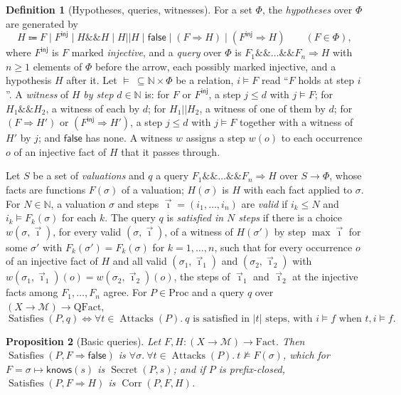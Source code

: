 \documentclass[11pt]{article}
\theoremstyle{definition}
\newtheorem{definition}{Definition}[section]
\theoremstyle{plain}
\newtheorem{proposition}[definition]{Proposition}
\theoremstyle{remark}
\newcommand{\N}{\mathbb{N}}
\newcommand{\Proc}{\mathrm{Proc}}
\newcommand{\Fact}{\mathrm{Fact}}
\newcommand{\Attacks}{\operatorname{Attacks}}
\newcommand{\Secret}{\operatorname{Secret}}
\newcommand{\Corr}{\operatorname{Corr}}
\newcommand{\Satisfies}{\operatorname{Satisfies}}
\begin{document}
\begin{definition}[Hypotheses, queries, witnesses]\label{def:queries-trace}
For a set $\Phi$, the \emph{hypotheses} over $\Phi$ are generated by
\[
H\Coloneqq F\mid F^{\mathsf{inj}}\mid H\mathbin{\&\&}H\mid H\mathbin{||}H\mid\mathsf{false}\mid(F\Longrightarrow H)\mid(F^{\mathsf{inj}}\Longrightarrow H)\qquad(F\in\Phi),
\]
where $F^{\mathsf{inj}}$ is $F$ marked \emph{injective}, and a \emph{query} over $\Phi$ is $F_1\mathbin{\&\&}\dots\mathbin{\&\&}F_n\Longrightarrow H$ with $n\ge1$ elements of $\Phi$ before the arrow, each possibly marked injective, and a hypothesis $H$ after it. Let $\models\ \subseteq\N\times\Phi$ be a relation, $i\models F$ read ``$F$ holds at step $i$''. A \emph{witness} of $H$ \emph{by step} $d\in\N$ is: for $F$ or $F^{\mathsf{inj}}$, a step $j\le d$ with $j\models F$; for $H_1\mathbin{\&\&}H_2$, a witness of each by $d$; for $H_1\mathbin{||}H_2$, a witness of one of them by $d$; for $(F\Longrightarrow H')$ or $(F^{\mathsf{inj}}\Longrightarrow H')$, a step $j\le d$ with $j\models F$ together with a witness of $H'$ by $j$; and $\mathsf{false}$ has none. A witness $w$ assigns a step $w(o)$ to each occurrence $o$ of an injective fact of $H$ that it passes through.

Let $S$ be a set of \emph{valuations} and $q$ a query $F_1\mathbin{\&\&}\dots\mathbin{\&\&}F_n\Longrightarrow H$ over $S\to\Phi$, whose facts are functions $F(\sigma)$ of a valuation; $H(\sigma)$ is $H$ with each fact applied to $\sigma$. For $N\in\N$, a valuation $\sigma$ and steps $\vec\imath=(i_1,\dots,i_n)$ are \emph{valid} if $i_k\le N$ and $i_k\models F_k(\sigma)$ for each $k$. The query $q$ is \emph{satisfied in $N$ steps} if there is a choice $w(\sigma,\vec\imath)$, for every valid $(\sigma,\vec\imath)$, of a witness of $H(\sigma')$ by step $\max\vec\imath$ for some $\sigma'$ with $F_k(\sigma')=F_k(\sigma)$ for $k=1,\dots,n$, such that for every occurrence $o$ of an injective fact of $H$ and all valid $(\sigma_1,\vec\imath_1)$ and $(\sigma_2,\vec\imath_2)$ with $w(\sigma_1,\vec\imath_1)(o)=w(\sigma_2,\vec\imath_2)(o)$, the steps of $\vec\imath_1$ and $\vec\imath_2$ at the injective facts among $F_1,\dots,F_n$ agree. For $P\in\Proc$ and a query $q$ over $(X\to\mathcal{M})\to\mathrm{QFact}$,
\[
\Satisfies(P,q)\iff\forall t\in\Attacks(P).\ q\text{ is satisfied in $|t|$ steps, with $i\models f$ when $t,i\models f$.}
\]
\end{definition}

\begin{proposition}[Basic queries]\label{prop:basic}
Let $F,H:(X\to\mathcal{M})\to\Fact$. Then $\Satisfies(P,F\Longrightarrow\mathsf{false})$ is $\forall\sigma.\ \forall t\in\Attacks(P).\ t\not\models F(\sigma)$, which for $F=\sigma\mapsto\mathsf{knows}(s)$ is $\Secret(P,s)$; and if $P$ is prefix-closed, $\Satisfies(P,F\Longrightarrow H)$ is $\Corr(P,F,H)$.
\end{proposition}
\end{document}
